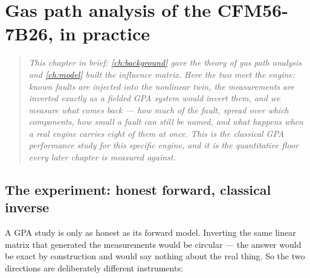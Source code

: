 \chapter{Gas path analysis of the CFM56-7B26, in practice}
\label{ch:gpa-practice}

\begin{quote}\itshape
This chapter in brief: \cref{ch:background} gave the theory of gas path analysis and
\cref{ch:model} built the influence matrix. Here the two meet the engine: known faults are
injected into the nonlinear twin, the measurements are inverted exactly as a fielded GPA
system would invert them, and we measure what comes back --- how much of the fault, spread
over which components, how small a fault can still be named, and what happens when a real
engine carries eight of them at once. This is the classical GPA performance study for this
specific engine, and it is the quantitative floor every later chapter is measured against.
\end{quote}



\section{The experiment: honest forward, classical inverse}
\label{sec:gpa-setup}

A GPA study is only as honest as its forward model. Inverting the same linear matrix that
generated the measurements would be circular --- the answer would be exact by construction and
would say nothing about the real thing. So the two directions are deliberately different
instruments:

